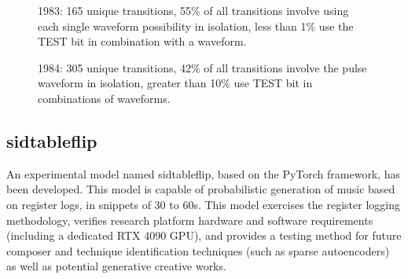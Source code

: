 \documentclass[10pt]{article}
\begin{document}
\begin{multicols*}{2}
\begin{figure}
\noindent{}
\caption{1983: 165 unique transitions, 55\% of all transitions involve using each single waveform possibility in isolation, less than 1\% use the TEST bit in combination with a waveform.}
\label{c1983}
\end{figure}

\begin{figure}
\noindent{}
\caption{1984: 305 unique transitions, 42\% of all transitions involve the pulse waveform in isolation, greater than 10\% use TEST bit in combinations of waveforms.}
\label{c1984}
\end{figure}

\subsection{sidtableflip}
\label{sidtableflip}

An experimental model named sidtableflip\cite{sidtableflip}, based on the PyTorch framework, has been developed. This model is capable of probabilistic generation of music based on register logs, in snippets of 30 to 60s. This model exercises the register logging methodology, verifies research platform hardware and software requirements (including a dedicated RTX 4090 GPU), and provides a testing method for future composer and technique identification techniques (such as sparse autoencoders)  as well as potential generative creative works.


\end{multicols*}
\end{document}
